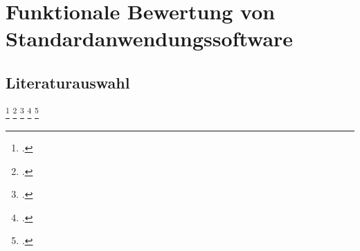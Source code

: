 \chapter{Funktionale Bewertung von Standardanwendungssoftware}
\section{Literaturauswahl}
\lipsum[1]\footcite{Sailer2016}
\lipsum[1]\footcite[Vgl.][S. 45-47]{Sailer2016}
\lipsum[1]\footcite[S. 45-47]{Sailer2016}
\lipsum[1]\footcite{git-scm}
\lipsum[1]\footcite{supabase}